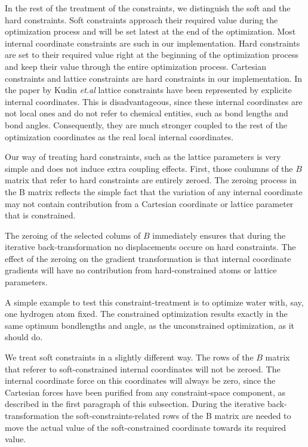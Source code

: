 \documentclass[prl,aps,preprint,superbib,12pt]{revtex4}
\begin{document}
In the rest of the treatment of the constraints, we distinguish
the soft and the hard constraints.
Soft constraints approach their required value during the
optimization process and will be set latest at the end of the
optimization. Most internal coordinate constraints are such
in our implementation. Hard constraints are set to their required
value right at the beginning of the optimization process and keep their
value through the entire optimization process. 
Cartesian constraints and lattice constraints are hard constraints 
in our implementation. In the paper by Kudin {\it et.al} \cite{KKudin01}
lattice constraints have been represented by explicite internal
coordinates. This is disadvantageous, since these internal coordinates 
are not local ones and do not refer to chemical entities, such as bond
lengths and bond angles. Consequently, they are much stronger coupled
to the rest of the optimization coordinates as the real local internal 
coordinates.

Our way of treating hard constraints, such as the lattice parameters
is very simple and does not induce extra coupling effects. 
First, those coulumns of the $B$ matrix that refer 
to hard constraints are entirely zeroed. 
The zeroing process in the B matrix reflects the simple fact 
that the variation of any internal coordinate may not contain 
contribution from a Cartesian coordinate or lattice parameter 
that is constrained.

The zeroing of the selected colums of $B$ immediately
ensures that during the iterative back-transformation 
\cite{PPulay77} no displacements occure on hard constraints.
The effect of the zeroing on the gradient transformation is that
internal coordinate gradients will have 
no contribution from 
hard-constrained atoms or lattice parameters.

A simple example to test this constraint-treatment is to optimize water
with, say, one hydrogen atom fixed. The constrained optimization
results exactly in the same optimum bondlengths and angle, 
as the unconstrained optimization, as it should do.

We treat soft constraints in a slightly different way. The rows
of the $B$ matrix that referer to soft-constrained internal coordinates
will not be zeroed. The internal coordinate force on this
coordinates will always be zero, since the Cartesian forces have been
purified from any constraint-space component, as described in the first
paragraph of this subsection. During the iterative back-transformation
the soft-constraints-related rows of the B matrix are needed to 
move the actual value of the soft-constrained coordinate towards
its required value.
\end{document}
